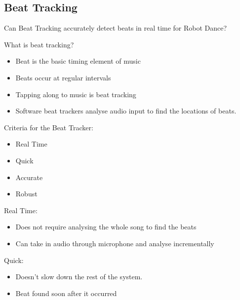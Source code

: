 \documentclass{beamer}
\begin{document}
	\subsection{Beat Tracking}
	\begin{frame}
		\subsectionpage
	\end{frame}
	\begin{frame}
		Can Beat Tracking accurately detect beats in real time for Robot Dance?
	\end{frame}
	\begin{frame}
		What is beat tracking?
		\begin{itemize}
			\item Beat is the basic timing element of music
			\item Beats occur at regular intervals
			\item Tapping along to music is beat tracking
			\item Software beat trackers analyse audio input to find the locations of beats.
		\end{itemize}
	\end{frame}
	\begin{frame}
		Criteria for the Beat Tracker:
		\begin{itemize}
			\item Real Time %
			\item Quick %
			\item Accurate %
			\item Robust	%
		\end{itemize}
	\end{frame}
	\begin{frame}
		Real Time:
		\begin{itemize}
			\item Does not require analysing the whole song to find the beats
			\item Can take in audio through microphone and analyse incrementally
		\end{itemize}		
	\end{frame}
	\begin{frame}
		Quick:
		\begin{itemize}
			\item Doesn't slow down the rest of the system.
			\item Beat found soon after it occurred
		\end{itemize}		
	\end{frame}
\end{document}
